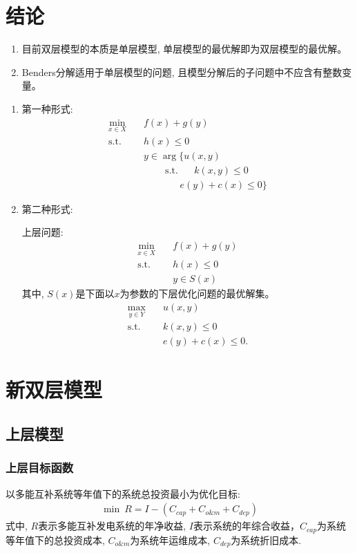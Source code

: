 \documentclass{article}
\begin{document}
\section{结论}
\begin{enumerate}
    \item {目前双层模型的本质是单层模型, 单层模型的最优解即为双层模型的最优解。}
    \item {Benders分解适用于单层模型的问题, 且模型分解后的子问题中不应含有整数变量。}
\end{enumerate}

\clearpage

\begin{enumerate}
    \item 第一种形式:
    \begin{align}
        \min_{x\in X}\quad & f(x)+g(y)  \\
        \mathrm{s.t.}\quad &h(x)\leq0  \\
        &y\in\mathop{\arg\max_{y\in Y}}\{u(x,y) \\
        &\qquad~\mathrm{s.t.}~~~\quad k(x,y)\leq0\\
        &~~~~~~~~~~~~~~~~~e(y)+c(x)\leq0\}
    \end{align}

    \item 第二种形式:
    
    上层问题:
    \begin{align}
        \min_{x\in X}\quad & f(x)+g(y)  \\
        \mathrm{s.t.}\quad &h(x)\leq0  \\
        &y\in S(x) 
    \end{align}
    其中, $S(x)$是下面以$x$为参数的下层优化问题的最优解集。
    \begin{align}
        \max_{y\in Y}\quad&u(x,y)\\
        \mathrm{s.t.}\quad&k(x,y)\leq0\\
        &e(y)+c(x)\leq0.
    \end{align}
\end{enumerate}

\clearpage
\setcounter{section}{0}
\section{新双层模型}
\subsection{上层模型}
\subsubsection{上层目标函数}
以多能互补系统等年值下的系统总投资最小为优化目标:
\setcounter{equation}{0}
\begin{align}
    \min~ R=I-\left(C_{cap}+C_{o\&m}+C_{dep}\right)
\end{align}
式中, $R$表示多能互补发电系统的年净收益, $I$表示系统的年综合收益，$C_{cap}$为系统等年值下的总投资成本, $C_{o\&m}$为系统年运维成本, $C_{dep}$为系统折旧成本.
\end{document}
